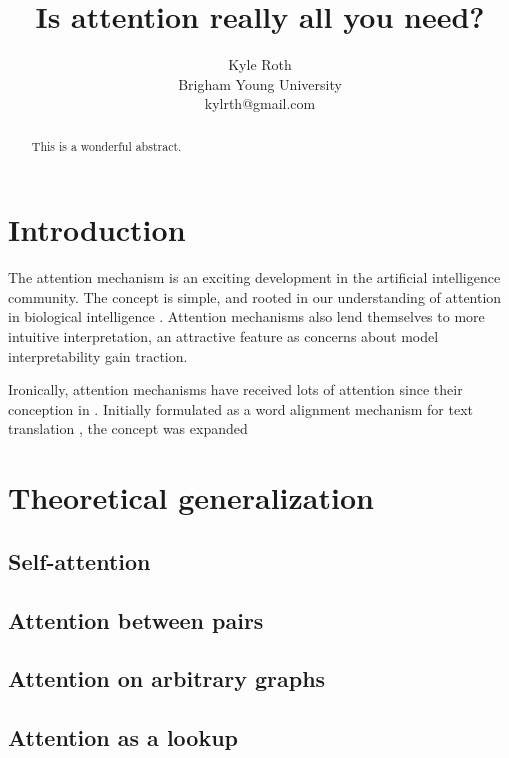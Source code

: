 \documentclass{article}
\title{Is attention really all you need?}
\author{
Kyle Roth\\
\affiliations
Brigham Young University\\
\emails
kylrth@gmail.com
}
\begin{document}
\maketitle

\tableofcontents

\vspace{30px}

\begin{abstract}
This is a wonderful abstract.
\end{abstract}

\section{Introduction}

The attention mechanism is an exciting development in the artificial intelligence community. The concept is simple, and rooted in our understanding of attention in biological intelligence \cite{glimpses,neuroscience-inspired}. Attention mechanisms also lend themselves to more intuitive interpretation, an attractive feature as concerns about model interpretability gain traction.

Ironically, attention mechanisms have received lots of attention since their conception in \citeyear{joint_align_translate}. Initially formulated as a word alignment mechanism for text translation \cite{joint_align_translate}, the concept was expanded

\section{Theoretical generalization}

\subsection{Self-attention}

\subsection{Attention between pairs}

\subsection{Attention on arbitrary graphs}

\subsection{Attention as a lookup}
\end{document}
